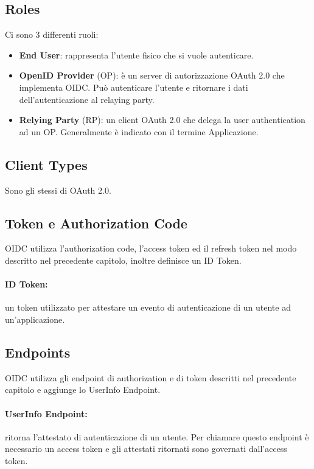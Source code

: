 \subsection{Roles}

Ci sono 3 differenti ruoli:

\begin{itemize}
      \item \textbf{End User}: rappresenta l'utente fisico che si vuole autenticare.
      \item \textbf{OpenID Provider} (OP): è un server di autorizzazione OAuth 2.0 che
            implementa OIDC. Può autenticare l'utente e ritornare i dati dell'autenticazione
            al relaying party.
      \item \textbf{Relying Party} (RP): un client OAuth 2.0 che delega la user
            authentication
            ad un OP. Generalmente è indicato con il termine Applicazione.
\end{itemize}

\subsection{Client Types}

Sono gli stessi di OAuth 2.0.

\subsection{Token e Authorization Code}

OIDC utilizza l'authorization code, l'access token ed il refresh token nel modo descritto
nel precedente capitolo, inoltre definisce un ID Token.

\paragraph{ID Token:} un token utilizzato per attestare un evento di autenticazione
di un utente ad un'applicazione.

\subsection{Endpoints}

OIDC utilizza gli endpoint di authorization e di token descritti nel precedente capitolo
e aggiunge lo UserInfo Endpoint.

\paragraph{UserInfo Endpoint:} ritorna l'attestato di autenticazione di un utente.
Per chiamare questo endpoint è necessario un access token e gli attestati ritornati
sono governati dall'access token.

